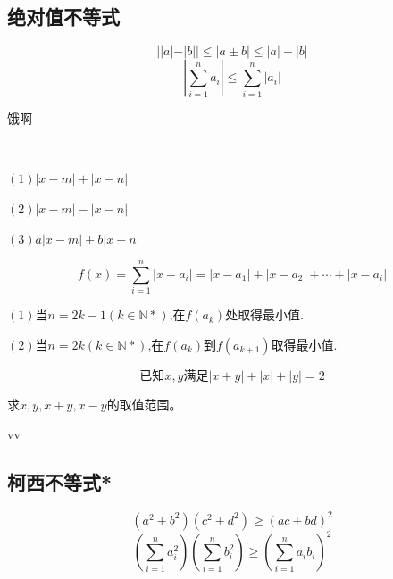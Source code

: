 \subsection{绝对值不等式}
\begin{theorem}[绝对值不等式]
  \[||a|-|b||\leq|a\pm b|\leq |a|+|b|\]
  \[|\sum_{i=1}^{n}a_i|\leq\sum_{i=1}^{n}|a_i|\]  
\end{theorem}
\begin{corollary}
    饿啊
\end{corollary}
\begin{example}
    \ 

    $(1)$$|x-m|+|x-n|$

    $(2)$$|x-m|-|x-n|$

    $(3)$$a|x-m|+b|x-n|$
\end{example}
\begin{example}
    \[f(x)=\sum_{i=1}^{n}|x-a_i|=|x-a_1|+|x-a_2|+\cdots+|x-a_i|\]

    $(1)$当$n=2k-1(k\in \mathbb{N} *)$,在$f(a_k)$处取得最小值.

    $(2)$当$n=2k(k\in \mathbb{N} *)$,在$f(a_k)$到$f(a_{k+1})$取得最小值.
\end{example}
\begin{example}
    \[\text{已知}x,y\text{满足}|x+y|+|x|+|y|=2\]

    求$x,y,x+y,x-y$的取值范围。
\end{example}
\begin{definition}[距离空间]\label{def:距离空间}
    
\end{definition}
\begin{axiom}
    vv
\end{axiom}
\clearpage
\subsection{柯西不等式*}
\begin{theorem}[Cauchy不等式]\label{thm:Cauchy不等式}
    \[(a^2+b^2)(c^2+d^2)\geq(ac+bd)^2\]
\[(\sum_{i=1}^{n}a_i^2)(\sum_{i=1}^{n}b_i^2)\geq(\sum_{i=1}^{n}a_ib_i)^2\]
\end{theorem}

